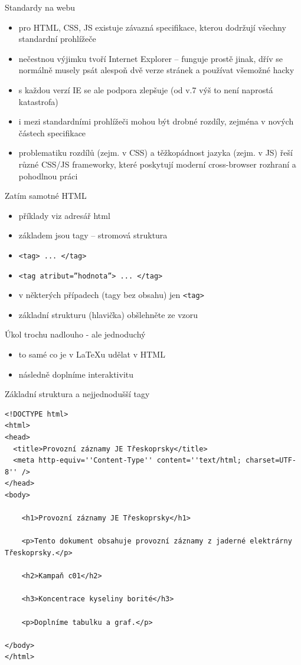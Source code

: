 \documentclass{beamer}
\begin{document}
\begin{frame}{Standardy na webu}
  \begin{itemize}
    \item pro HTML, CSS, JS existuje závazná specifikace, kterou dodržují všechny standardní prohlížeče
    \item nečestnou výjimku tvoří Internet Explorer -- funguje prostě jinak, dřív se normálně musely psát alespoň dvě verze stránek a používat všemožné hacky
    \item s každou verzí IE se ale podpora zlepšuje (od v.7 výš to není naprostá katastrofa)
    \item i mezi standardními prohlížeči mohou být drobné rozdíly, zejména v nových částech specifikace
    \item problematiku rozdílů (zejm. v CSS) a těžkopádnost jazyka (zejm. v JS) řeší různé CSS/JS frameworky, které poskytují moderní cross-browser rozhraní a pohodlnou práci
  \end{itemize}
\end{frame}

\begin{frame}{Zatím samotné HTML}
  \begin{itemize}
    \item příklady viz adresář html
    \item základem jsou tagy -- stromová struktura
    \item \texttt{<tag> ... </tag>}
    \item \texttt{<tag atribut=''hodnota''> ... </tag>}
    \item v některých případech (tagy bez obsahu) jen \texttt{<tag>}
    \item základní strukturu (hlavička) obšlehněte ze vzoru
  \end{itemize}
\end{frame}

\begin{frame}{Úkol trochu nadlouho - ale jednoduchý}
  \begin{itemize}
    \item to samé co je v LaTeXu udělat v HTML
    \item následně doplníme interaktivitu
  \end{itemize}
\end{frame}

\begin{frame}[fragile]{Základní struktura a nejjednodušší tagy}
  \tiny
  \begin{verbatim}
<!DOCTYPE html>
<html>
<head>
  <title>Provozní záznamy JE Třeskoprsky</title>
  <meta http-equiv=''Content-Type'' content=''text/html; charset=UTF-8'' />
</head>
<body>

    <h1>Provozní záznamy JE Třeskoprsky</h1>

    <p>Tento dokument obsahuje provozní záznamy z jaderné elektrárny Třeskoprsky.</p>

    <h2>Kampaň c01</h2>

    <h3>Koncentrace kyseliny borité</h3>

    <p>Doplníme tabulku a graf.</p>

</body>
</html>
  \end{verbatim}
\end{frame}
\end{document}
